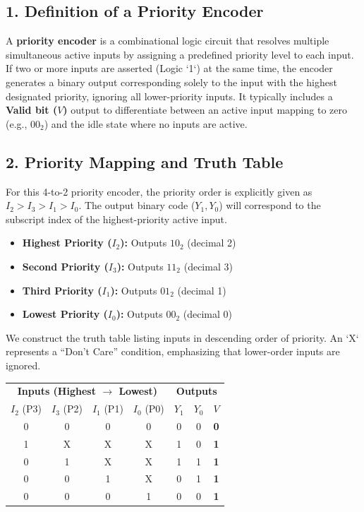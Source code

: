 \documentclass[12pt,a3paper]{article}
\begin{document}
\begin{enumerate}
\begin{tcolorbox}[enhanced,breakable,ansbox,colback=cD!4,colframe=cD,boxrule=0.8pt,arc=5pt,title={\textbf{Answer}},fonttitle=\bfseries\color{white},colbacktitle=cD]
\subsection*{1. Definition of a Priority Encoder}
A \textbf{priority encoder} is a combinational logic circuit that resolves multiple simultaneous active inputs by assigning a predefined priority level to each input. If two or more inputs are asserted (Logic `1`) at the same time, the encoder generates a binary output corresponding solely to the input with the highest designated priority, ignoring all lower-priority inputs. It typically includes a \textbf{Valid bit ($V$)} output to differentiate between an active input mapping to zero (e.g., $00_2$) and the idle state where no inputs are active.

\subsection*{2. Priority Mapping and Truth Table}
For this 4-to-2 priority encoder, the priority order is explicitly given as \textbf{$I_2 > I_3 > I_1 > I_0$}. The output binary code ($Y_1, Y_0$) will correspond to the subscript index of the highest-priority active input.
\begin{itemize}
    \item \textbf{Highest Priority ($I_2$):} Outputs $10_2$ (decimal 2)
    \item \textbf{Second Priority ($I_3$):} Outputs $11_2$ (decimal 3)
    \item \textbf{Third Priority ($I_1$):} Outputs $01_2$ (decimal 1)
    \item \textbf{Lowest Priority ($I_0$):} Outputs $00_2$ (decimal 0)
\end{itemize}

We construct the truth table listing inputs in descending order of priority. An `X` represents a ``Don't Care'' condition, emphasizing that lower-order inputs are ignored.

\begin{center}
\renewcommand{\arraystretch}{1.2}
\begin{tabular}{cccc|ccc}
\toprule
\multicolumn{4}{c|}{\textbf{Inputs (Highest $\rightarrow$ Lowest)}} & \multicolumn{3}{c}{\textbf{Outputs}} \\
$I_2$ (P3) & $I_3$ (P2) & $I_1$ (P1) & $I_0$ (P0) & $Y_1$ & $Y_0$ & $V$ \\
\midrule
0 & 0 & 0 & 0 & 0 & 0 & \textcolor{cD}{\textbf{0}} \\
1 & X & X & X & 1 & 0 & \textcolor{cD}{\textbf{1}} \\
0 & 1 & X & X & 1 & 1 & \textcolor{cD}{\textbf{1}} \\
0 & 0 & 1 & X & 0 & 1 & \textcolor{cD}{\textbf{1}} \\
0 & 0 & 0 & 1 & 0 & 0 & \textcolor{cD}{\textbf{1}} \\
\bottomrule
\end{tabular}
\end{center}


\end{tcolorbox}
\end{enumerate}
\end{document}
